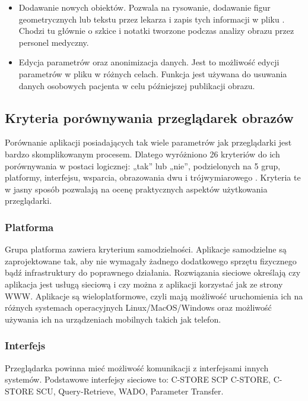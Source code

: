 \begin{itemize}
    \item Dodawanie nowych obiektów.
          Pozwala na rysowanie, dodawanie figur geometrycznych lub tekstu przez lekarza i zapis tych informacji w pliku \DICOM.
          Chodzi tu głównie o szkice i notatki tworzone podczas analizy obrazu przez personel medyczny.

    \item Edycja parametrów oraz anonimizacja danych.
          Jest to możliwość edycji parametrów w pliku \DICOM w różnych celach.
          Funkcja jest używana do usuwania danych osobowych pacjenta w celu późniejszej publikacji obrazu.

\end{itemize}

\subsection{Kryteria porównywania przeglądarek obrazów}

Porównanie aplikacji posiadających tak wiele parametrów jak przeglądarki \DICOM jest bardzo skomplikowanym procesem.
Dlatego wyróżniono 26 kryteriów do ich porównywania w postaci logicznej: „tak” lub „nie”, podzielonych na 5 grup, platformy, interfejsu, wsparcia, obrazowania dwu i trójwymiarowego \cite{SurveyofDICOMViewer}.
Kryteria te w jasny sposób pozwalają na ocenę praktycznych aspektów użytkowania przeglądarki.

\subsubsection{Platforma}

Grupa platforma zawiera kryterium samodzielności.
Aplikacje samodzielne są zaprojektowane tak, aby nie wymagały żadnego dodatkowego sprzętu fizycznego bądź infrastruktury do poprawnego działania.
Rozwiązania sieciowe określają czy aplikacja jest usługą sieciową i czy można z aplikacji korzystać jak ze strony WWW.
Aplikacje są wieloplatformowe, czyli mają możliwość uruchomienia ich na różnych systemach operacyjnych Linux/MacOS/Windows oraz możliwość używania ich na urządzeniach mobilnych takich jak telefon.

\subsubsection{Interfejs}

Przeglądarka powinna mieć możliwość komunikacji z interfejsami innych systemów.
Podstawowe interfejsy sieciowe to: C-STORE SCP \DICOM C-STORE, C-STORE SCU, Query-Retrieve, WADO, Parameter Transfer.

